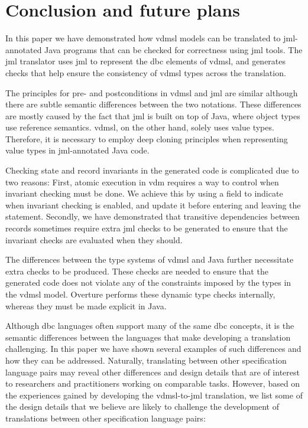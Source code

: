 \section{Conclusion and future plans}
\label{sec:con}

In this paper we have demonstrated how \ac{vdmsl} models can be
translated to \ac{jml}-annotated Java programs that can be checked for
correctness using \ac{jml} tools. The \ac{jml} translator uses
\ac{jml} to represent the \ac{dbc} elements of \ac{vdmsl}, and
generates checks that help ensure the consistency of \ac{vdmsl} types
across the translation.

The principles for pre- and postconditions in \ac{vdmsl} and \ac{jml}
are similar although there are subtle semantic differences between the
two notations. These differences are mostly caused by the fact that
\ac{jml} is built on top of Java, where object types use reference
semantics. \ac{vdmsl}, on the other hand, solely uses value
types. Therefore, it is necessary to employ deep cloning principles
when representing value types in \ac{jml}-annotated Java code.

Checking state and record invariants in the generated code is
complicated due to two reasons: First, atomic execution in \ac{vdm}
requires a way to control when invariant checking must be done. We
achieve this by using a  field to indicate when invariant
checking is enabled, and update it before entering and leaving the
 statement. Secondly, we have demonstrated that transitive
dependencies between records sometimes require extra \ac{jml} checks
to be generated to ensure that the invariant checks are evaluated when
they should.

The differences between the type systems of \ac{vdmsl} and Java
further necessitate extra checks to be produced. These checks are
needed to ensure that the generated code does not violate any of the
constraints imposed by the types in the \ac{vdmsl} model. Overture
performs these dynamic type checks internally, whereas they must be
made explicit in Java.

Although \ac{dbc} languages often support many of the same \ac{dbc}
concepts, it is the semantic differences between the languages that
make developing a translation challenging. In this paper we have shown
several examples of such differences and how they can be
addressed. Naturally, translating between other specification language
pairs may reveal other differences and design details that are of
interest to researchers and practitioners working on comparable
tasks. However, based on the experiences gained by developing the
\ac{vdmsl}-to-\ac{jml} translation, we list some of the design details
that we believe are likely to challenge the development of
translations between other specification language pairs:

